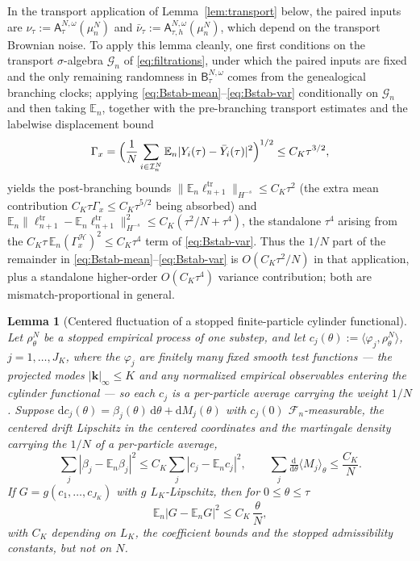 \documentclass[a4paper,fleqn]{cas-sc}
\newtheorem{lemma}[theorem]{Lemma}
\theoremstyle{definition}
\theoremstyle{remark}
\begin{document}
In the transport application of Lemma~\ref{lem:transport} below, the paired
inputs are $\nu_\tau:=\mathsf A^{N,\omega}_\tau(\mu^N_n)$ and
$\bar\nu_\tau:=\mathsf A^{N,\omega}_{\tau,h}(\mu^N_n)$, which depend on the
transport Brownian noise. To apply this lemma cleanly, one first conditions on
the transport $\sigma$-algebra $\mathcal G_n$ of \eqref{eq:filtrations}, under
which the paired inputs are fixed and the only
remaining randomness in $\mathsf B^{N,\omega}_\tau$ comes from the genealogical
branching clocks; applying \eqref{eq:Bstab-mean}--\eqref{eq:Bstab-var} conditionally
on $\mathcal G_n$ and then taking $\mathbb E_n$, together with the
pre-branching transport estimates and the labelwise displacement bound
\[
\Gamma_x=\Bigl(\frac1N\sum_{i\in\mathcal I^N_n}\mathbb E_n|Y_i(\tau)-\bar Y_i(\tau)|^2\Bigr)^{1/2}\le C_K\tau^{3/2},
\]
yields the post-branching bounds $\|\mathbb E_n\ell^{\mathrm{tr}}_{n+1}\|_{H^{-s}}\le C_K\tau^2$
(the extra mean contribution $C_K\tau\Gamma_x\le C_K\tau^{5/2}$ being absorbed) and
$\mathbb E_n\|\ell^{\mathrm{tr}}_{n+1}-\mathbb E_n\ell^{\mathrm{tr}}_{n+1}\|_{H^{-s}}^2
\le C_K(\tau^2/N+\tau^4)$, the standalone $\tau^4$ arising from the
$C_K\tau\,\mathbb E_n(\Gamma_x^{\mathcal H})^2\le C_K\tau^4$ term of
\eqref{eq:Bstab-var}. Thus the $1/N$ part of the remainder in
\eqref{eq:Bstab-mean}--\eqref{eq:Bstab-var} is $O(C_K\tau^2/N)$ in that
application, plus a standalone higher-order $O(C_K\tau^4)$ variance contribution;
both are mismatch-proportional in general.

\begin{lemma}[Centered fluctuation of a stopped finite-particle cylinder functional]\label{lem:cyl-centered}
Let $\rho^N_\theta$ be a stopped empirical process of one substep, and let
$c_j(\theta):=\langle\varphi_j,\rho^N_\theta\rangle$, $j=1,\dots,J_K$, where the $\varphi_j$ are
finitely many fixed smooth test functions --- the projected modes $|\mathbf k|_\infty\le K$ and
any normalized empirical observables entering the cylinder functional --- so each $c_j$ is a
per-particle average carrying the weight $1/N$. Suppose
$\mathrm dc_j(\theta)=\beta_j(\theta)\,\mathrm d\theta+\mathrm dM_j(\theta)$ with $c_j(0)$
$\mathcal F_n$-measurable, the centered drift Lipschitz in the centered coordinates and the
martingale density carrying the $1/N$ of a per-particle average,
\[
\sum_j|\beta_j-\mathbb E_n\beta_j|^2\le C_K\sum_j|c_j-\mathbb E_nc_j|^2,
\qquad
\sum_j\tfrac{\mathrm d}{\mathrm d\theta}\langle M_j\rangle_\theta\le\frac{C_K}N .
\]
If $G=g(c_1,\dots,c_{J_K})$ with $g$ $L_K$-Lipschitz, then for $0\le\theta\le\tau$
\begin{equation}\label{eq:cyl-centered}
\mathbb E_n\bigl|G-\mathbb E_nG\bigr|^2\le C_K\,\frac\theta N,
\end{equation}
with $C_K$ depending on $L_K$, the coefficient bounds and the stopped admissibility
constants, but not on $N$.
\end{lemma}
\end{document}
